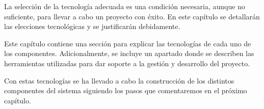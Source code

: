 \label{s:tech}

La selección de la tecnología adecuada es una condición necesaria, aunque no suficiente, para llevar a cabo un proyecto con éxito. En este capítulo se detallarán las elecciones tecnológicas y se justificarán debidamente.

Este capítulo contiene una sección para explicar las tecnologías de cada uno de los componentes. Adicionalmente, se incluye un apartado donde se describen las herramientas utilizadas para dar soporte a la gestión y desarrollo del proyecto.

\vspace{1cm}

Con estas tecnologías se ha llevado a cabo la construcción de los distintos componentes del sistema siguiendo los pasos que comentaremos en el próximo capítulo.
